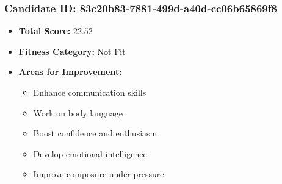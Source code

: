 \documentclass{article}
\begin{document}
\subsubsection{Candidate ID: 83c20b83-7881-499d-a40d-cc06b65869f8}
\begin{itemize}
    \item \textbf{Total Score:} 22.52
    \item \textbf{Fitness Category:} Not Fit
    \item \textbf{Areas for Improvement:}
    \begin{itemize}
        \item Enhance communication skills
        \item Work on body language
        \item Boost confidence and enthusiasm
        \item Develop emotional intelligence
        \item Improve composure under pressure
    \end{itemize}
\end{itemize}
\end{document}
